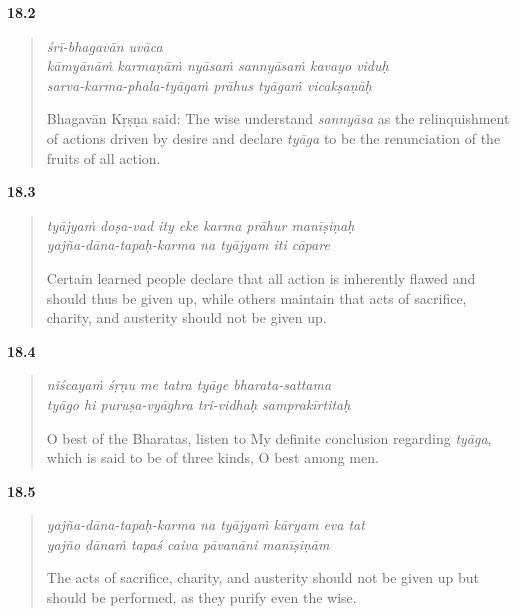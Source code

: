 \par\noindent\textbf{18.2}\par
\begin{verse}
\textit{śrī-bhagavān uvāca} \\
\textit{kāmyānāṁ karmaṇāṁ nyāsaṁ sannyāsaṁ kavayo viduḥ} \\
\textit{sarva-karma-phala-tyāgaṁ prāhus tyāgaṁ vicakṣaṇāḥ}

\noindent Bhagavān Kṛṣṇa said: The wise understand \textit{sannyāsa} as the relinquishment of actions driven by desire and declare \textit{tyāga} to be the renunciation of the fruits of all action.
\end{verse}
\par



\par\noindent\textbf{18.3}\par
\begin{verse}
\textit{tyājyaṁ doṣa-vad ity eke karma prāhur manīṣiṇaḥ} \\
\textit{yajña-dāna-tapaḥ-karma na tyājyam iti cāpare}

\noindent Certain learned people declare that all action is inherently flawed and should thus be given up, while others maintain that acts of sacrifice, charity, and austerity should not be given up.
\end{verse}
\par



\par\noindent\textbf{18.4}\par
\begin{verse}
\textit{niścayaṁ śṛṇu me tatra tyāge bharata-sattama} \\
\textit{tyāgo hi puruṣa-vyāghra tri-vidhaḥ samprakīrtitaḥ}

\noindent O best of the Bharatas, listen to My definite conclusion regarding \textit{tyāga}, which is said to be of three kinds, O best among men.
\end{verse}
\par



\par\noindent\textbf{18.5}\par
\begin{verse}
\textit{yajña-dāna-tapaḥ-karma na tyājyaṁ kāryam eva tat} \\
\textit{yajño dānaṁ tapaś caiva pāvanāni manīṣiṇām}

\noindent The acts of sacrifice, charity, and austerity should not be given up but should be performed, as they purify even the wise.
\end{verse}
\par



